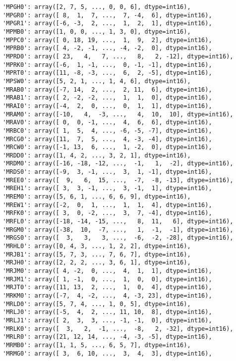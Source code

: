 \documentclass[11pt]{article}
\begin{document}
\begin{verbatim}
 'MPGH0': array([2, 7, 5, ..., 0, 0, 6], dtype=int16),
 'MPGR0': array([ 8,  1,  7, ...,  7, -4,  6], dtype=int16),
 'MPGR1': array([-6, -3,  2, ...,  1,  2,  1], dtype=int16),
 'MPMB0': array([1, 0, 0, ..., 1, 3, 0], dtype=int16),
 'MPPC0': array([ 0, 18, 19, ...,  1,  9,  2], dtype=int16),
 'MPRB0': array([ 4, -2, -1, ..., -4, -2,  0], dtype=int16),
 'MPRD0': array([ 23,   4,   7, ...,   8,   2, -12], dtype=int16),
 'MPRK0': array([-6,  1, -1, ...,  0, -1, -1], dtype=int16),
 'MPRT0': array([11, -8, -3, ...,  6,  2, -5], dtype=int16),
 'MPSW0': array([5, 2, 1, ..., 1, 4, 6], dtype=int16),
 'MRAB0': array([-7, 14,  2, ...,  2, 11,  6], dtype=int16),
 'MRAB1': array([ 2, -2, -2, ...,  1,  1,  0], dtype=int16),
 'MRAI0': array([-4,  2,  0, ...,  0,  1,  1], dtype=int16),
 'MRAM0': array([-10,   4,  -3, ...,   4,  10,  10], dtype=int16),
 'MRAV0': array([ 0,  0, -1, ...,  4,  6,  6], dtype=int16),
 'MRBC0': array([ 1,  5,  4, ..., -6, -5, -7], dtype=int16),
 'MRCG0': array([11,  7,  5, ...,  4, -3, -4], dtype=int16),
 'MRCW0': array([-1, 13,  6, ...,  1, -2,  0], dtype=int16),
 'MRDD0': array([1, 4, 2, ..., 3, 2, 1], dtype=int16),
 'MRDM0': array([-16, -18, -12, ...,  -1,   1,  -2], dtype=int16),
 'MRDS0': array([-9,  3, -1, ...,  3,  1, -1], dtype=int16),
 'MREE0': array([  9,   6,  15, ...,  -7,  -8, -13], dtype=int16),
 'MREH1': array([ 3,  3, -1, ...,  3, -1,  1], dtype=int16),
 'MREM0': array([5, 6, 1, ..., 6, 6, 9], dtype=int16),
 'MREW1': array([-2,  0,  1, ...,  1,  1,  4], dtype=int16),
 'MRFK0': array([ 3,  0, -2, ...,  3,  7, -4], dtype=int16),
 'MRFL0': array([-18, -14, -15, ...,   8,  11,   6], dtype=int16),
 'MRGM0': array([-38,  10,  -7, ...,   1,  -1,  -1], dtype=int16),
 'MRGS0': array([  3,   3,   3, ...,  -6,  -2, -28], dtype=int16),
 'MRHL0': array([0, 4, 3, ..., 1, 2, 2], dtype=int16),
 'MRJB1': array([5, 7, 3, ..., 7, 6, 7], dtype=int16),
 'MRJH0': array([2, 2, 2, ..., 3, 6, 1], dtype=int16),
 'MRJM0': array([ 4, -2,  0, ...,  4,  1,  1], dtype=int16),
 'MRJM1': array([ 1, -1,  0, ...,  1,  0,  0], dtype=int16),
 'MRJT0': array([11, 13,  2, ...,  1,  0,  4], dtype=int16),
 'MRKM0': array([-7,  4, -2, ...,  4, -3, 23], dtype=int16),
 'MRLD0': array([5, 7, 4, ..., 1, 0, 5], dtype=int16),
 'MRLJ0': array([-5,  4,  2, ..., 11, 10,  8], dtype=int16),
 'MRLJ1': array([ 2,  3,  3, ..., -1, -1,  0], dtype=int16),
 'MRLK0': array([  3,   2,  -1, ...,  -8,   2, -32], dtype=int16),
 'MRLR0': array([21, 12, 14, ..., -4, -3, -5], dtype=int16),
 'MRMB0': array([1, 1, 5, ..., 6, 5, 7], dtype=int16),
 'MRMG0': array([ 3,  6, 10, ...,  3,  4,  3], dtype=int16),

\end{verbatim}
\end{document}
